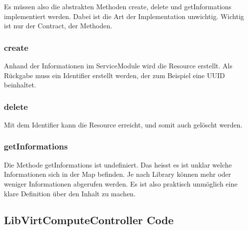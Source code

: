 \subsubsection{}
Es müssen also die abstrakten Methoden create, delete und getInformations implementiert werden. 
Dabei ist die Art der Implementation unwichtig. 
Wichtig ist nur der Contract, der Methoden.

\subsubsection{create}
Anhand der Informationen im ServiceModule wird die Resource erstellt. Als Rückgabe muss ein Identifier erstellt werden, der zum Beispiel eine UUID beinhaltet.

\subsubsection{delete}
Mit dem Identifier kann die Resource erreicht, und somit auch gelöscht werden.

\subsubsection{getInformations}
Die Methode getInformations ist undefiniert. Das heisst es ist unklar welche Informationen sich in der Map befinden. Je nach Library können mehr oder weniger Informationen abgerufen werden. 
Es ist also praktisch unmöglich eine klare Definition über den Inhalt zu machen.

\subsection{LibVirtComputeController Code}

